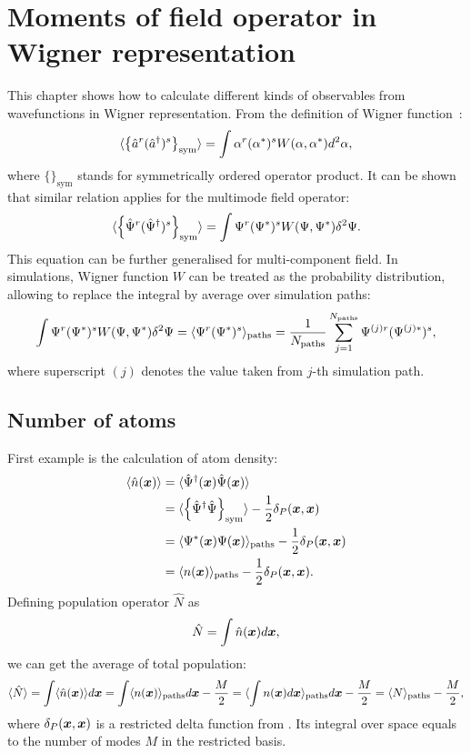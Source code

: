\section{Moments of field operator in Wigner representation}


This chapter shows how to calculate different kinds of observables from wavefunctions in Wigner representation.
From the definition of Wigner function~\cite{Gardiner2004}:
\[
	\langle \left\{  \hat{a}^r ( \hat{a}^\dagger)^s  \right\}_{\mathrm{sym}} \rangle
	= \int \alpha^r (\alpha^*)^s W (\alpha, \alpha^*) d^2\alpha ,
\]
where $\{\}_{\mathrm{sym}}$ stands for symmetrically ordered operator product.
It can be shown that similar relation applies for the multimode field operator:
\[
	\langle \left\{  \hat{\Psi}^r ( \hat{\Psi}^\dagger)^s  \right\}_{\mathrm{sym}} \rangle
	= \int \Psi^r (\Psi^*)^s W (\Psi, \Psi^*) \delta^2\Psi.
\]
This equation can be further generalised for multi-component field.
In simulations, Wigner function $W$ can be treated as the probability distribution, allowing to replace the integral by average over simulation paths:
\[
	\int \Psi^r (\Psi^*)^s W (\Psi, \Psi^*) \delta^2\Psi
	= \langle  \Psi^r (\Psi^*)^s  \rangle_{\mathrm{paths}}
	= \frac{1}{N_{\mathrm{paths}}} \sum\limits_{j=1}^{N_{\mathrm{paths}}}
		\Psi^{(j)r} (\Psi^{(j)*})^s,
\]
where superscript $(j)$ denotes the value taken from $j$-th simulation path.


\subsection{Number of atoms}

First example is the calculation of atom density:
\begin{equation*}
\begin{split}
		\langle \hat{n} (\boldsymbol{x}) \rangle
		& = \langle \hat{\Psi}^\dagger (\boldsymbol{x}) \hat{\Psi} (\boldsymbol{x}) \rangle \\
		& = \langle
				\left\{  \hat{\Psi}^\dagger \hat{\Psi}  \right\}_{\mathrm{sym}}
			\rangle - \frac{1}{2} \delta_P (\boldsymbol{x}, \boldsymbol{x}) \\
		& = \langle  \Psi^* (\boldsymbol{x}) \Psi (\boldsymbol{x})  \rangle_{\mathrm{paths}}
			- \frac{1}{2} \delta_P (\boldsymbol{x}, \boldsymbol{x}) \\
		& = \langle  n (\boldsymbol{x})  \rangle_{\mathrm{paths}}
			- \frac{1}{2} \delta_P (\boldsymbol{x}, \boldsymbol{x}).
\end{split}
\end{equation*}
Defining population operator $\hat{N}$ as
\[
	\hat{N} = \int \hat{n} (\boldsymbol{x}) d\boldsymbol{x},
\]
we can get the average of total population:
\[
		\langle \hat{N} \rangle
		= \int \langle \hat{n}(\boldsymbol{x}) \rangle d\boldsymbol{x}
		= \int \langle  n(\boldsymbol{x})  \rangle_{\mathrm{paths}} d\boldsymbol{x} - \frac{M}{2}
		= \langle  \int n(\boldsymbol{x}) d\boldsymbol{x}  \rangle_{\mathrm{paths}} d\boldsymbol{x} - \frac{M}{2}
		= \langle N \rangle_{\mathrm{paths}} - \frac{M}{2},
\]
where $\delta_P (\boldsymbol{x}, \boldsymbol{x})$ is a restricted delta function from .
Its integral over space equals to the number of modes $M$ in the restricted basis.

